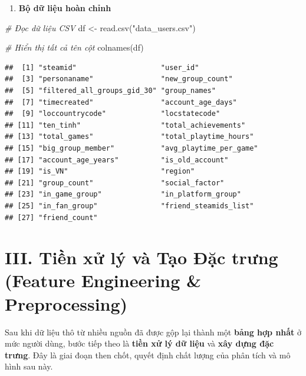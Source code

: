 \documentclass[
  11pt,
]{article}
\newenvironment{Shaded}{\begin{snugshade}}{\end{snugshade}}
\newcommand{\CommentTok}[1]{\textcolor[rgb]{0.56,0.35,0.01}{\textit{#1}}}
\newcommand{\FunctionTok}[1]{\textcolor[rgb]{0.00,0.00,0.00}{#1}}
\newcommand{\NormalTok}[1]{#1}
\newcommand{\OtherTok}[1]{\textcolor[rgb]{0.56,0.35,0.01}{#1}}
\newcommand{\StringTok}[1]{\textcolor[rgb]{0.31,0.60,0.02}{#1}}
\providecommand{\tightlist}{%
  \setlength{\itemsep}{0pt}\setlength{\parskip}{0pt}}
\begin{document}
\begin{enumerate}
\def\labelenumi{\arabic{enumi}.}
\setcounter{enumi}{6}
\tightlist
\item
  \textbf{Bộ dữ liệu hoàn chỉnh}
\end{enumerate}

\begin{Shaded}
\begin{Highlighting}[]
\CommentTok{\# Đọc dữ liệu CSV}
\NormalTok{df }\OtherTok{\textless{}{-}} \FunctionTok{read.csv}\NormalTok{(}\StringTok{"data\_users.csv"}\NormalTok{)}

\CommentTok{\# Hiển thị tất cả tên cột}
\FunctionTok{colnames}\NormalTok{(df)}
\end{Highlighting}
\end{Shaded}

\begin{verbatim}
##  [1] "steamid"                    "user_id"                   
##  [3] "personaname"                "new_group_count"           
##  [5] "filtered_all_groups_gid_30" "group_names"               
##  [7] "timecreated"                "account_age_days"          
##  [9] "loccountrycode"             "locstatecode"              
## [11] "ten_tinh"                   "total_achievements"        
## [13] "total_games"                "total_playtime_hours"      
## [15] "big_group_member"           "avg_playtime_per_game"     
## [17] "account_age_years"          "is_old_account"            
## [19] "is_VN"                      "region"                    
## [21] "group_count"                "social_factor"             
## [23] "in_game_group"              "in_platform_group"         
## [25] "in_fan_group"               "friend_steamids_list"      
## [27] "friend_count"
\end{verbatim}

\hypertarget{iii.-tiux1ec1n-xux1eed-luxfd-vuxe0-tux1ea1o-ux111ux1eb7c-trux1b0ng-feature-engineering-preprocessing}{%
\section{III. Tiền xử lý và Tạo Đặc trưng (Feature Engineering \&
Preprocessing)}\label{iii.-tiux1ec1n-xux1eed-luxfd-vuxe0-tux1ea1o-ux111ux1eb7c-trux1b0ng-feature-engineering-preprocessing}}

Sau khi dữ liệu thô từ nhiều nguồn đã được gộp lại thành một
\textbf{bảng hợp nhất} ở mức người dùng, bước tiếp theo là \textbf{tiền
xử lý dữ liệu} và \textbf{xây dựng đặc trưng}. Đây là giai đoạn then
chốt, quyết định chất lượng của phân tích và mô hình sau này.
\end{document}
